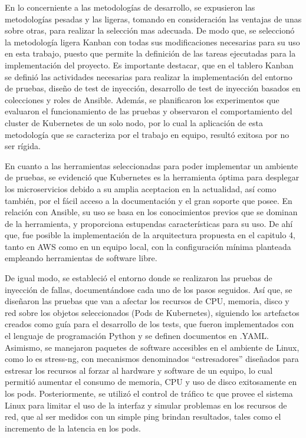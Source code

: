 \par En lo concerniente a las metodologías de desarrollo, se expusieron las metodologías pesadas y las ligeras, tomando en consideración las ventajas de unas sobre otras, para realizar la selección mas adecuada. De modo que, se seleccion\'o la metodología ligera Kanban con todas sus modificaciones necesarias para su uso en esta trabajo, puesto que permite la definición de las tareas ejecutadas para la implementación del proyecto. Es importante destacar, que en el tablero Kanban se definió las actividades necesarias para realizar la implementación del entorno de pruebas, diseño de test de inyección, desarrollo de test de inyección basados en colecciones y roles de Ansible. Además, se planificaron los experimentos que evaluaron el funcionamiento de las pruebas y observaron el comportamiento del cluster de Kubernetes de un solo nodo, por lo cual la  aplicación de esta metodología que se caracteriza por el trabajo en equipo, result\'o exitosa por no ser rígida. \\ 

\par En cuanto a las herramientas seleccionadas para poder implementar un ambiente de pruebas, se evidenci\'o que Kubernetes es la herramienta óptima para desplegar los microservicios debido a su amplia aceptacion en la actualidad, así como también, por el fácil acceso a la documentación y el gran soporte que posee. En relación con Ansible, su uso se basa en los conocimientos previos que se dominan de la herramienta, y proporciona estupendas características para su uso. De ahí que, fue posible la implementación de la arquitectura propuesta en el capitulo 4, tanto en AWS como en un equipo local, con la configuración mínima planteada empleando herramientas de software libre.\\ 

\par De igual modo, se estableció el entorno donde se realizaron las pruebas de inyección de fallas, documentándose cada uno de los pasos seguidos. Así que, se diseñaron las pruebas que van a afectar los recursos de CPU, memoria, disco y red sobre los objetos seleccionados (Pods de Kubernetes), siguiendo los artefactos creados como guía para el desarrollo de los tests, que fueron implementados con el lenguaje de programación Python y se definen documentos en .YAML. Asimismo, se manejaron paquetes de software accesibles en el ambiente de Linux, como lo es stress-ng, con mecanismos denominados ``estresadores'' diseñados para estresar los recursos al forzar al hardware y software de un equipo, lo cual permitió aumentar el consumo de memoria, CPU y uso de disco exitosamente en los pods. Posteriormente, se utiliz\'o el control de tr\'afico tc que provee el sistema Linux para limitar el uso de la interfaz y simular problemas en los recursos de red, que al ser medidos con un simple ping brindan resultados, tales como el incremento de la latencia en los pods.\\

